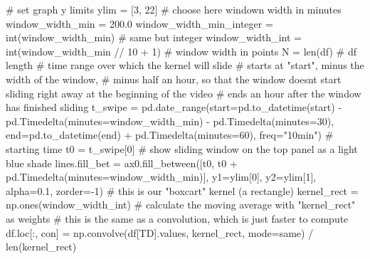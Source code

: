 \documentclass[
  letterpaper,
  DIV=11,
  numbers=noendperiod,
  oneside]{scrreprt}
\newenvironment{Shaded}{\begin{snugshade}}{\end{snugshade}}
\newcommand{\BuiltInTok}[1]{\textcolor[rgb]{0.00,0.23,0.31}{#1}}
\newcommand{\CommentTok}[1]{\textcolor[rgb]{0.37,0.37,0.37}{#1}}
\newcommand{\DecValTok}[1]{\textcolor[rgb]{0.68,0.00,0.00}{#1}}
\newcommand{\FloatTok}[1]{\textcolor[rgb]{0.68,0.00,0.00}{#1}}
\newcommand{\NormalTok}[1]{\textcolor[rgb]{0.00,0.23,0.31}{#1}}
\newcommand{\OperatorTok}[1]{\textcolor[rgb]{0.37,0.37,0.37}{#1}}
\newcommand{\StringTok}[1]{\textcolor[rgb]{0.13,0.47,0.30}{#1}}
\begin{document}
\begin{Shaded}
\begin{Highlighting}[]
\CommentTok{\# set graph y limits}
\NormalTok{ylim }\OperatorTok{=}\NormalTok{ [}\DecValTok{3}\NormalTok{, }\DecValTok{22}\NormalTok{]}
\CommentTok{\# choose here windown width in minutes}
\NormalTok{window\_width\_min }\OperatorTok{=} \FloatTok{200.0}
\NormalTok{window\_width\_min\_integer }\OperatorTok{=} \BuiltInTok{int}\NormalTok{(window\_width\_min)  }\CommentTok{\# same but integer}
\NormalTok{window\_width\_int }\OperatorTok{=} \BuiltInTok{int}\NormalTok{(window\_width\_min }\OperatorTok{//} \DecValTok{10} \OperatorTok{+} \DecValTok{1}\NormalTok{)  }\CommentTok{\# window width in points}
\NormalTok{N }\OperatorTok{=} \BuiltInTok{len}\NormalTok{(df)  }\CommentTok{\# df length}
\CommentTok{\# time range over which the kernel will slide}
\CommentTok{\# starts at "start", minus the width of the window,}
\CommentTok{\# minus half an hour, so that the window doesn\textquotesingle{}t start sliding right away at the beginning of the video}
\CommentTok{\# ends an hour after the window has finished sliding}
\NormalTok{t\_swipe }\OperatorTok{=}\NormalTok{ pd.date\_range(start}\OperatorTok{=}\NormalTok{pd.to\_datetime(start) }\OperatorTok{{-}}\NormalTok{ pd.Timedelta(minutes}\OperatorTok{=}\NormalTok{window\_width\_min) }\OperatorTok{{-}}\NormalTok{ pd.Timedelta(minutes}\OperatorTok{=}\DecValTok{30}\NormalTok{),}
\NormalTok{                        end}\OperatorTok{=}\NormalTok{pd.to\_datetime(end) }\OperatorTok{+}\NormalTok{ pd.Timedelta(minutes}\OperatorTok{=}\DecValTok{60}\NormalTok{),}
\NormalTok{                        freq}\OperatorTok{=}\StringTok{"10min"}\NormalTok{)}
\CommentTok{\# starting time}
\NormalTok{t0 }\OperatorTok{=}\NormalTok{ t\_swipe[}\DecValTok{0}\NormalTok{]}
\CommentTok{\# show sliding window on the top panel as a light blue shade}
\NormalTok{lines.fill\_bet }\OperatorTok{=}\NormalTok{ ax0.fill\_between([t0, t0 }\OperatorTok{+}\NormalTok{ pd.Timedelta(minutes}\OperatorTok{=}\NormalTok{window\_width\_min)],}
\NormalTok{                                           y1}\OperatorTok{=}\NormalTok{ylim[}\DecValTok{0}\NormalTok{], y2}\OperatorTok{=}\NormalTok{ylim[}\DecValTok{1}\NormalTok{], alpha}\OperatorTok{=}\FloatTok{0.1}\NormalTok{, zorder}\OperatorTok{={-}}\DecValTok{1}\NormalTok{)}
\CommentTok{\# this is our "boxcart" kernel (a rectangle)}
\NormalTok{kernel\_rect }\OperatorTok{=}\NormalTok{ np.ones(window\_width\_int)}
\CommentTok{\# calculate the moving average with "kernel\_rect" as weights}
\CommentTok{\# this is the same as a convolution, which is just faster to compute}
\NormalTok{df.loc[:, }\StringTok{\textquotesingle{}con\textquotesingle{}}\NormalTok{] }\OperatorTok{=}\NormalTok{ np.convolve(df[}\StringTok{\textquotesingle{}TD\textquotesingle{}}\NormalTok{].values, kernel\_rect, mode}\OperatorTok{=}\StringTok{\textquotesingle{}same\textquotesingle{}}\NormalTok{) }\OperatorTok{/} \BuiltInTok{len}\NormalTok{(kernel\_rect)}

\end{Highlighting}
\end{Shaded}
\end{document}
